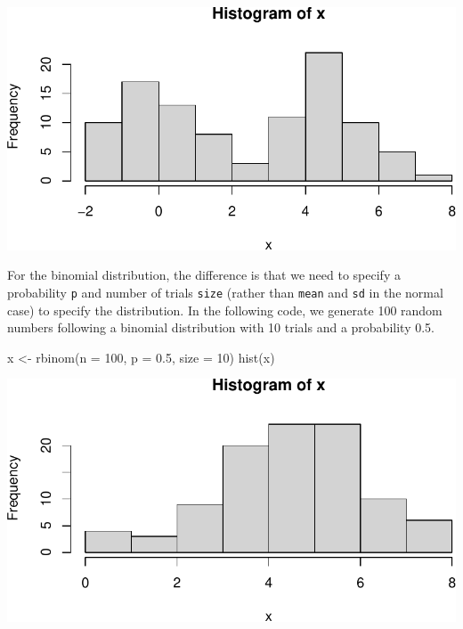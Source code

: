 \documentclass[
  letterpaper,
]{latex/krantz}
\makeatletter
\newenvironment{Shaded}{\begin{snugshade}}{\end{snugshade}}
\newcommand{\AttributeTok}[1]{\textcolor[rgb]{0.40,0.45,0.13}{#1}}
\newcommand{\DecValTok}[1]{\textcolor[rgb]{0.68,0.00,0.00}{#1}}
\newcommand{\FloatTok}[1]{\textcolor[rgb]{0.68,0.00,0.00}{#1}}
\newcommand{\FunctionTok}[1]{\textcolor[rgb]{0.28,0.35,0.67}{#1}}
\newcommand{\NormalTok}[1]{\textcolor[rgb]{0.00,0.23,0.31}{#1}}
\newcommand{\OtherTok}[1]{\textcolor[rgb]{0.00,0.23,0.31}{#1}}
\newenvironment{kframe}{%
\medskip{}
\setlength{\fboxsep}{.8em}
 \def\at@end@of@kframe{}%
 \ifinner\ifhmode%
  \def\at@end@of@kframe{\end{minipage}}%
  \begin{minipage}{\columnwidth}%
 \fi\fi%
 \def\FrameCommand##1{\hskip\@totalleftmargin \hskip-\fboxsep
 \colorbox{shadecolor}{##1}\hskip-\fboxsep
     \hskip-\linewidth \hskip-\@totalleftmargin \hskip\columnwidth}%
 \MakeFramed {\advance\hsize-\width
   \@totalleftmargin\z@ \linewidth\hsize
   \@setminipage}}%
 {\par\unskip\endMakeFramed%
 \at@end@of@kframe}
\renewenvironment{Shaded}{\begin{kframe}}{\end{kframe}}
\makeatother
\begin{document}
\begin{center}
\includegraphics[width=1\textwidth,height=\textheight]{book/distributions_files/figure-pdf/unnamed-chunk-5-1.pdf}
\end{center}

For the binomial distribution, the difference is that we need to specify
a probability \texttt{p} and number of trials \texttt{size} (rather than
\texttt{mean} and \texttt{sd} in the normal case) to specify the
distribution. In the following code, we generate 100 random numbers
following a binomial distribution with 10 trials and a probability 0.5.

\begin{Shaded}
\begin{Highlighting}[]
\NormalTok{x }\OtherTok{\textless{}{-}} \FunctionTok{rbinom}\NormalTok{(}\AttributeTok{n =} \DecValTok{100}\NormalTok{, }\AttributeTok{p =} \FloatTok{0.5}\NormalTok{, }\AttributeTok{size =} \DecValTok{10}\NormalTok{)}
\FunctionTok{hist}\NormalTok{(x)}
\end{Highlighting}
\end{Shaded}

\begin{center}
\includegraphics[width=1\textwidth,height=\textheight]{book/distributions_files/figure-pdf/unnamed-chunk-6-1.pdf}
\end{center}
\end{document}

